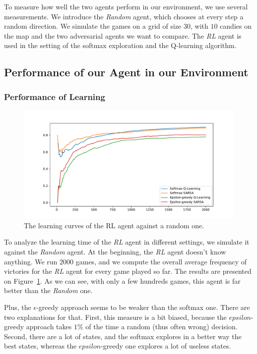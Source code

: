 \documentclass[journal, a4paper]{IEEEtran}
\begin{document}
To measure how well the two agents perform in our environment, we use several measurements.
We introduce the \emph{Random} agent, which chooses at every step a random direction.
We simulate the games on a grid of size $30$, with $10$ candies on the map and the two adversarial agents we want to compare.
The \emph{RL} agent is used in the setting of the softmax exploration and the Q-learning algorithm.

\subsection{Performance of our Agent in our Environment}

\subsubsection{Performance of Learning}

\begin{figure}[h]
	\centering
    \includegraphics[width=0.95\columnwidth]{images/learning_curves.pdf}
    \caption{\label{learning_curve_against_random}The learning curves of the RL agent against a random one.}
\end{figure}

To analyze the learning time of the \emph{RL} agent in different settings, we simulate it against the \emph{Random} agent.
At the beginning, the \emph{RL} agent doesn't know anything.
We run $2000$ games, and we compute the overall average frequency of victories for the \emph{RL} agent for every game played so far.
The results are presented on Figure~\ref{learning_curve_against_random}.
As we can see, with only a few hundreds games, this agent is far better than the \emph{Random} one.

Plus, the $\epsilon$-greedy approach seems to be weaker than the softmax one.
There are two explanations for that.
First, this measure is a bit biased, because the $epsilon$-greedy approach takes $1$\% of the time a random (thus often wrong) decision.
Second, there are a lot of states, and the softmax explores in a better way the best states, whereas the $epsilon$-greedy one explores a lot of useless states.
\end{document}
